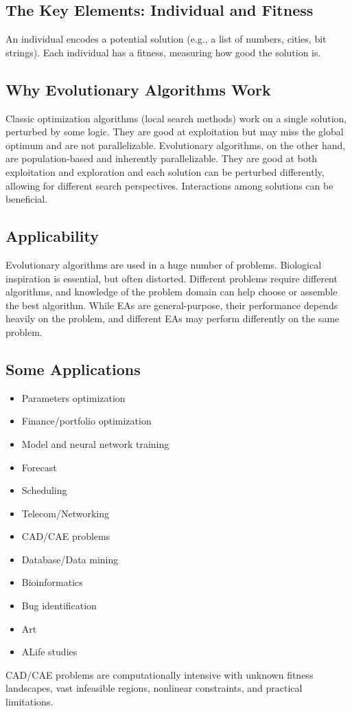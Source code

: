\subsection*{The Key Elements: Individual and Fitness}
An individual encodes a potential solution (e.g., a list of numbers, cities, bit strings). Each individual has a fitness, measuring how good the solution is.

\subsection*{Why Evolutionary Algorithms Work}
Classic optimization algorithms (local search methods) work on a single solution, perturbed by some logic. They are good at exploitation but may miss the global optimum and are not parallelizable. Evolutionary algorithms, on the other hand, are population-based and inherently parallelizable. They are good at both exploitation and exploration and each solution can be perturbed differently, allowing for different search perspectives. Interactions among solutions can be beneficial.

\subsection*{Applicability}
Evolutionary algorithms are used in a huge number of problems. Biological inspiration is essential, but often distorted. Different problems require different algorithms, and knowledge of the problem domain can help choose or assemble the best algorithm. While EAs are general-purpose, their performance depends heavily on the problem, and different EAs may perform differently on the same problem.

\subsection*{Some Applications}
\begin{itemize}
    \item  Parameters optimization
    \item  Finance/portfolio optimization
    \item  Model and neural network training
    \item  Forecast
    \item  Scheduling
    \item  Telecom/Networking
    \item CAD/CAE problems
    \item  Database/Data mining
    \item Bioinformatics
    \item Bug identification
    \item Art
    \item ALife studies
\end{itemize}
CAD/CAE problems are computationally intensive with unknown fitness landscapes, vast infeasible regions, nonlinear constraints, and practical limitations.

